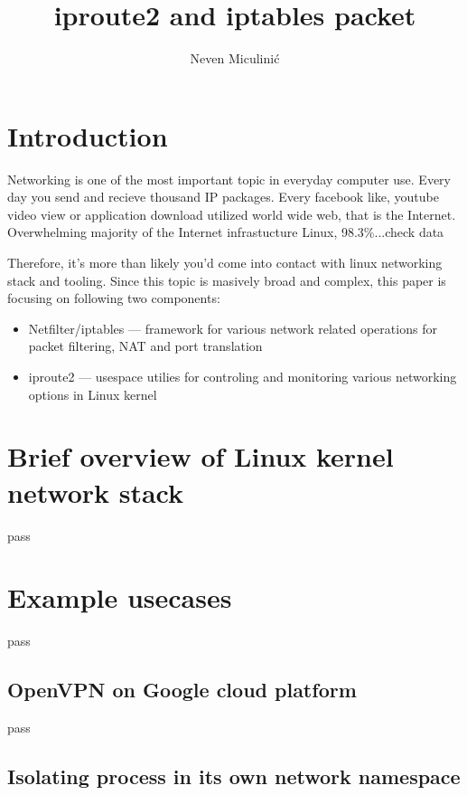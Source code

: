 \documentclass[times, utf8, seminar, english]{fer}
\begin{document}
\theoremstyle{definition}
\newtheorem{definition}{Definition}[section]

\title{iproute2 and iptables packet}
\author{Neven Miculinić}

\maketitle
\tableofcontents

\chapter{Introduction}

Networking is one of the most important topic in everyday computer use. Every day you send and recieve thousand IP packages. 
Every facebook like, youtube video view or application download utilized world wide web, that is the Internet.
Overwhelming majority of the Internet infrastucture Linux, 98.3\%...check data

Therefore, it's more than likely you'd come into contact with linux networking stack and tooling.
Since this topic is masively broad and complex, this paper is focusing on following two components:
\begin{itemize}
    \item Netfilter/iptables --- framework for various network related operations for packet filtering, NAT and port translation
    \item iproute2 --- usespace utilies for controling and monitoring various networking options in Linux kernel
\end{itemize}

\chapter{Brief overview of Linux kernel network stack}
pass
\chapter{Example usecases}
pass
\section{OpenVPN on Google cloud platform}
pass
\section{Isolating process in its own network namespace}



\end{document}
